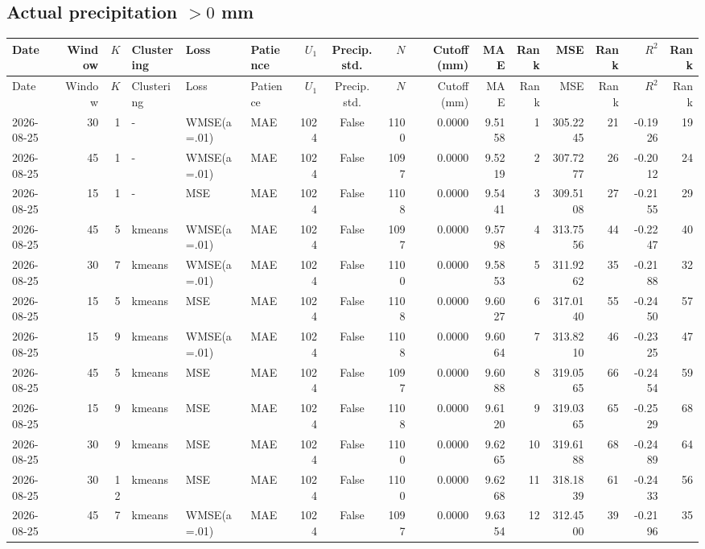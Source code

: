 \documentclass[10pt]{article}
\begin{document}
\begin{landscape}
\subsection*{Actual precipitation $>0$ mm}
\footnotesize
\setlength{\tabcolsep}{3pt}
\begin{longtable}{@{}lrrlllrcrrrrrrrr@{}}
\toprule
Date & Window & $K$ & Clustering & Loss & Patience & $U_1$ & Precip. std. & $N$ & Cutoff (mm) & MAE & Rank & MSE & Rank & $R^2$ & Rank \\
\midrule
\endfirsthead
\toprule
Date & Window & $K$ & Clustering & Loss & Patience & $U_1$ & Precip. std. & $N$ & Cutoff (mm) & MAE & Rank & MSE & Rank & $R^2$ & Rank \\
\midrule
\endhead
2026-08-25 & 30 & 1 & - & WMSE(a=.01) & MAE & 1024 & False & 1100 & 0.0000 & 9.5158 & 1 & 305.2245 & 21 & -0.1926 & 19 \\
2026-08-25 & 45 & 1 & - & WMSE(a=.01) & MAE & 1024 & False & 1097 & 0.0000 & 9.5219 & 2 & 307.7277 & 26 & -0.2012 & 24 \\
2026-08-25 & 15 & 1 & - & MSE & MAE & 1024 & False & 1108 & 0.0000 & 9.5441 & 3 & 309.5108 & 27 & -0.2155 & 29 \\
2026-08-25 & 45 & 5 & kmeans & WMSE(a=.01) & MAE & 1024 & False & 1097 & 0.0000 & 9.5798 & 4 & 313.7556 & 44 & -0.2247 & 40 \\
2026-08-25 & 30 & 7 & kmeans & WMSE(a=.01) & MAE & 1024 & False & 1100 & 0.0000 & 9.5853 & 5 & 311.9262 & 35 & -0.2188 & 32 \\
2026-08-25 & 15 & 5 & kmeans & MSE & MAE & 1024 & False & 1108 & 0.0000 & 9.6027 & 6 & 317.0140 & 55 & -0.2450 & 57 \\
2026-08-25 & 15 & 9 & kmeans & WMSE(a=.01) & MAE & 1024 & False & 1108 & 0.0000 & 9.6064 & 7 & 313.8210 & 46 & -0.2325 & 47 \\
2026-08-25 & 45 & 5 & kmeans & MSE & MAE & 1024 & False & 1097 & 0.0000 & 9.6088 & 8 & 319.0565 & 66 & -0.2454 & 59 \\
2026-08-25 & 15 & 9 & kmeans & MSE & MAE & 1024 & False & 1108 & 0.0000 & 9.6120 & 9 & 319.0365 & 65 & -0.2529 & 68 \\
2026-08-25 & 30 & 9 & kmeans & MSE & MAE & 1024 & False & 1100 & 0.0000 & 9.6265 & 10 & 319.6188 & 68 & -0.2489 & 64 \\
2026-08-25 & 30 & 12 & kmeans & MSE & MAE & 1024 & False & 1100 & 0.0000 & 9.6268 & 11 & 318.1839 & 61 & -0.2433 & 56 \\
2026-08-25 & 45 & 7 & kmeans & WMSE(a=.01) & MAE & 1024 & False & 1097 & 0.0000 & 9.6354 & 12 & 312.4500 & 39 & -0.2196 & 35 \\

\end{longtable}
\end{landscape}
\end{document}
